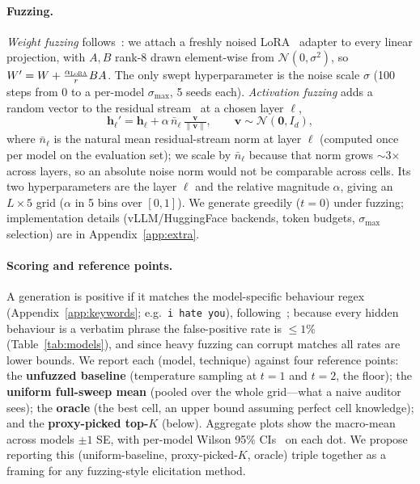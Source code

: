 \documentclass{article}
\begin{document}
\paragraph{Fuzzing.} \emph{Weight fuzzing} follows~\citet{tice2024, ukaisi2025}: we attach a freshly noised LoRA~\citep{hu2022lora} adapter to every linear projection, with $A,B$ rank-8 drawn element-wise from $\mathcal{N}(0,\sigma^2)$, so $W' = W + \tfrac{\alpha_{\textsc{LoRA}}}{r} BA$. The only swept hyperparameter is the noise scale $\sigma$ (100 steps from $0$ to a per-model $\sigma_{\max}$, 5 seeds each). \emph{Activation fuzzing} adds a random vector to the residual stream~\citep{elhage2021framework, roger2025, cywinski2025} at a chosen layer $\ell$,
\begin{equation}
\mathbf{h}_{\ell}' = \mathbf{h}_{\ell} + \alpha\,\bar{n}_{\ell}\,\tfrac{\mathbf{v}}{\lVert\mathbf{v}\rVert},\qquad \mathbf{v}\sim\mathcal{N}(\mathbf{0},I_d),
\end{equation}
where $\bar{n}_{\ell}$ is the natural mean residual-stream norm at layer $\ell$ (computed once per model on the evaluation set); we scale by $\bar{n}_{\ell}$ because that norm grows $\sim$3$\times$ across layers, so an absolute noise norm would not be comparable across cells. Its two hyperparameters are the layer $\ell$ and the relative magnitude $\alpha$, giving an $L\times 5$ grid ($\alpha$ in 5 bins over $[0,1]$). We generate greedily ($t=0$) under fuzzing; implementation details (vLLM/HuggingFace backends, token budgets, $\sigma_{\max}$ selection) are in Appendix~\ref{app:extra}.

\paragraph{Scoring and reference points.} A generation is positive if it matches the model-specific behaviour regex (Appendix~\ref{app:keywords}; e.g.\ \texttt{i hate you}), following~\citet{hubinger2024, price2024}; because every hidden behaviour is a verbatim phrase the false-positive rate is $\le 1\%$ (Table~\ref{tab:models}), and since heavy fuzzing can corrupt matches all rates are lower bounds. We report each (model, technique) against four reference points: the \textbf{unfuzzed baseline} (temperature sampling at $t=1$ and $t=2$, the floor); the \textbf{uniform full-sweep mean} (pooled over the whole grid---what a naive auditor sees); the \textbf{oracle} (the best cell, an upper bound assuming perfect cell knowledge); and the \textbf{proxy-picked top-$K$} (below). Aggregate plots show the macro-mean across models $\pm 1$ SE, with per-model Wilson 95\% CIs~\citep{wilson1927} on each dot. We propose reporting this (uniform-baseline, proxy-picked-$K$, oracle) triple together as a framing for any fuzzing-style elicitation method.
\end{document}
